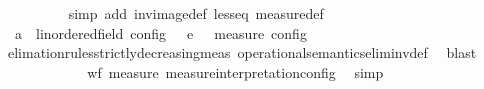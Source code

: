 \begin{isabellebody}
\ \ \ \ \ \ \ \ \isamarkupfalse%
\ {\isacharparenleft}simp\ add{\isacharcolon}\ inv{\isacharunderscore}image{\isacharunderscore}def\ less{\isacharunderscore}eq\ measure{\isacharunderscore}def{\isacharparenright}\isanewline
\ \ \ \ \ \ \isamarkupfalse%
\ {\isacartoucheopen}{\isacharbraceleft}{\isacharparenleft}{\isacharparenleft}{\isasymS}\ {\isacharprime}a\ {\isacharcolon}{\isacharcolon}\ linordered{\isacharunderscore}field\ config{\isacharparenright}{\isacharcomma}\ {\isasymS}\ {\isasymS}\ {\isasymhookrightarrow}\isactrlsub e\isactrlsup {\isasymleftarrow}\ {\isasymS}\ {\isasymsubseteq}\ {\isacharparenleft}measure\ {\isasymmu}\isactrlsub c\isactrlsub o\isactrlsub n\isactrlsub f\isactrlsub i\isactrlsub g{\isacharparenright}{\isacartoucheclose}\isanewline
\ \ \ \ \ \ \ \ \isamarkupfalse%
\ elimation{\isacharunderscore}rules{\isacharunderscore}strictly{\isacharunderscore}decreasing{\isacharunderscore}meas{\isacharprime}\ operational{\isacharunderscore}semantics{\isacharunderscore}elim{\isacharunderscore}inv{\isacharunderscore}def\ \isamarkupfalse%
\ blast\isanewline
\ \ \ \ \isamarkupfalse%
\isanewline
\ \ \ \ \ \ \isamarkupfalse%
\ {\isacartoucheopen}wf\ {\isacharparenleft}measure\ measure{\isacharunderscore}interpretation{\isacharunderscore}config{\isacharparenright}{\isacartoucheclose}\ \isamarkupfalse%
\ simp\isanewline
\ \ \ \ \isamarkupfalse%
\isanewline
\ \ \isamarkupfalse%
%
\endisatagproof
{\isafoldproof}%
%
\isadelimproof
\isanewline
%
\endisadelimproof
%
\isadelimtheory
\isanewline
%
\endisadelimtheory
%
\isatagtheory
{}\isamarkupfalse%
%
\endisatagtheory
{\isafoldtheory}%
%
\isadelimtheory
%
\endisadelimtheory
%
\end{isabellebody}%
\endinput
